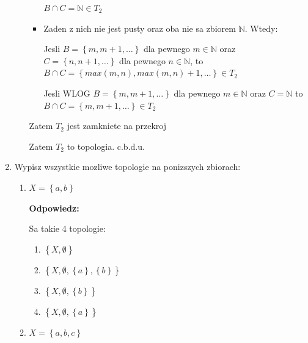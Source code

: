 \documentclass{article}
\begin{document}
\begin{enumerate}
\begin{itemize}
\begin{itemize}
                        $B\cap C = \mathbb{N} \in T_{2}$

                    \item Zaden z nich nie jest pusty oraz oba nie sa zbiorem $\mathbb{N}$. Wtedy:

                        Jesli $B = \left\{m, m+1, \dots\right\}$ dla pewnego $m \in \mathbb{N}$ oraz $C =  \left\{n, n+1, \dots\right\}$ dla pewnego $n \in \mathbb{N}$, to $B\cap C = \left\{max(m,n), max(m,n)+1, \dots\right\} \in T_{2}$
                        \vspace{5mm}

                        Jesli WLOG $B = \left\{m, m+1, \dots\right\}$ dla pewnego $m \in \mathbb{N}$ oraz $C = \mathbb{N}$ to $B\cap C = \left\{m, m+1, \dots\right\} \in T_{2}$ 
                \end{itemize}%
                Zatem $T_{2}$ jest zamkniete na przekroj

                Zatem $T_{2}$ to topologia. c.b.d.u.
        \end{itemize}%

    \item Wypisz wszystkie mozliwe topologie na ponizszych zbiorach:

        \begin{enumerate}[label=(\alph*)]%
            \item $X = \left\{a,b\right\}$

                \textbf{Odpowiedz:}

                Sa takie 4 topologie:
                \begin{enumerate}[label={$T_{\arabic*} = $}]%

                    \item $\left\{X, \emptyset\right\}$
                    \item $\left\{X, \emptyset, \left\{a\right\}, \left\{b\right\} \right\}$
                    \item $\left\{X, \emptyset, \left\{b\right\} \right\}$
                    \item $\left\{X, \emptyset, \left\{a\right\} \right\}$
                \end{enumerate}%

            \item $X = \left\{a,b,c\right\}$   


\end{enumerate}
\end{enumerate}
\end{document}
